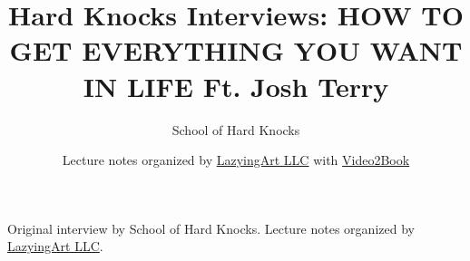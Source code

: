\documentclass[11pt,oneside]{book}
\begin{document}
\frontmatter
\title{Hard Knocks Interviews: HOW TO GET EVERYTHING YOU WANT IN LIFE Ft. Josh Terry}
\author{School of Hard Knocks}
\date{Lecture notes organized by \href{https://lazying.art}{LazyingArt LLC} with \href{https://github.com/lachlanchen/Video2Book}{Video2Book}}
\maketitle
\begin{center}
\small Original interview by School of Hard Knocks. Lecture notes organized by \href{https://lazying.art}{LazyingArt LLC}.
\end{center}
\clearpage
\mainmatter

\end{document}
